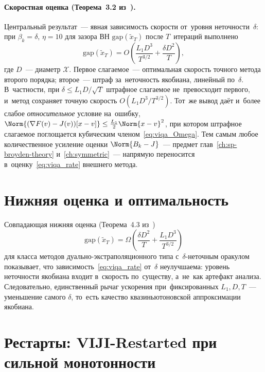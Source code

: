 \paragraph{Скоростная оценка (Теорема~3.2 из~\cite{viqa2024}).}
\label{par:viqa_rate}
Центральный результат~--- явная зависимость скорости от~уровня
неточности~$\delta$: при $\beta_k=\delta$, $\eta=10$ для зазора ВН
$\mathrm{gap}(\widetilde{x}_T)$ после $T$~итераций выполнено
\begin{equation}\label{eq:viqa_rate}
  \mathrm{gap}(\widetilde{x}_T)
  = O\!\left(\frac{L_1 D^3}{T^{3/2}} + \frac{\delta D^2}{T}\right),
\end{equation}
где $D$~--- диаметр $\mathcal{X}$. Первое слагаемое~--- оптимальная
скорость точного метода второго порядка; второе~--- штраф за~неточность
якобиана, линейный по~$\delta$. В~частности, при $\delta\le L_1 D/\sqrt{T}$
штрафное слагаемое не~превосходит первого, и~метод сохраняет точную
скорость $O(L_1 D^3/T^{3/2})$. Тот~же вывод даёт и~более слабое
\emph{относительное} условие на~ошибку,
$\Norm{(\nabla F(v)-J(v))[x-v]}\le\tfrac{L_1}{2}\Norm{x-v}^2$, при котором
штрафное слагаемое поглощается кубическим членом~\eqref{eq:viqa_Omega}.
Тем самым любое количественное усиление оценки $\Norm{B_k-J}$~--- предмет
глав~\ref{ch:sp-broyden-theory} и~\ref{ch:symmetric}~--- напрямую
переносится в~оценку~\eqref{eq:viqa_rate} внешнего метода.

\section{Нижняя оценка и оптимальность}\label{sec:viqa_lower}

Совпадающая нижняя оценка (Теорема~4.3 из~\cite{viqa2024})
\begin{equation}\label{eq:viqa_lower}
  \mathrm{gap}(\widetilde{x}_T)
  = \Omega\!\left(\frac{\delta D^2}{T} + \frac{L_1 D^3}{T^{3/2}}\right)
\end{equation}
для класса методов дуально-экстраполяционного типа с~$\delta$-неточным
оракулом показывает, что зависимость~\eqref{eq:viqa_rate} от~$\delta$
неулучшаема: уровень неточности якобиана входит в~скорость по~существу,
а~не~как артефакт анализа. Следовательно, единственный рычаг ускорения
при~фиксированных $L_1, D, T$~--- уменьшение самого $\delta$, то~есть
качество квазиньютоновской аппроксимации якобиана.

\section{Рестарты: VIJI-Restarted при сильной монотонности}\label{sec:viqa_restart}

